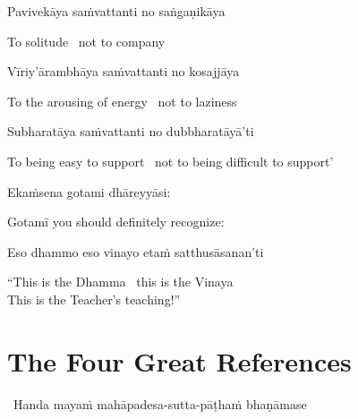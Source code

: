 Pavivekāya saṁvattanti no saṅgaṇikāya

\begin{english}
  To solitude \breathmark\ not to company
\end{english}

Vīriy'ārambhāya saṁvattanti no kosajjāya

\begin{english}
  To the arousing of energy \breathmark\ not to laziness
\end{english}

Subharatāya saṁvattanti no dubbharatāyā'ti

\begin{english}
  To being easy to support \breathmark\ not to being difficult to support'
\end{english}

Ekaṁsena gotami dhāreyyāsi:

\begin{english}
  Gotamī\makeatletter\hyperlink{endnote85-appendix}\makeatother
  you should definitely recognize:
\end{english}

Eso dhammo eso vinayo etaṁ satthusāsanan'ti

\begin{english}
  ``This is the Dhamma \breathmark\ this is the Vinaya\\
  This is the Teacher's teaching!''
\end{english}

\suttaRef{[AN 8.53]}


\section{The Four Great References}
\label{four-great-references}

\begin{leader}
  \anglebracketleft\ \hspace{-0.5mm}Handa mayaṁ mahāpadesa-sutta-pāṭhaṁ bhaṇāmase \hspace{-0.5mm}\anglebracketright\
\end{leader}

